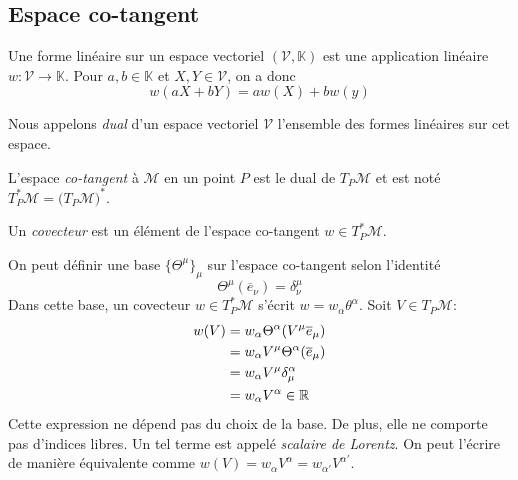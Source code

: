 {\subsection{Espace co-tangent}
\begin{theoremframe}
    \begin{defi}
        Une forme linéaire sur un espace vectoriel $(\mathcal{V},\mathbb{K})$ est une application linéaire $w:\mathcal{V} \to \mathbb{K}$. Pour $a,b\in \mathbb{K}$ et $X,Y \in \mathcal{V}$, on a donc
        \begin{equation}
            w(aX+bY) = aw(X)+bw(y)
        \end{equation}
    \end{defi}
\end{theoremframe}
Nous appelons \textit{dual} d'un espace vectoriel $\mathcal{V}$ l'ensemble des formes linéaires sur cet espace.
\begin{theoremframe}
    \begin{defi}
        L'espace \textit{co-tangent} à $\mathcal{M}$ en un point $P$ est le dual de $T_P\mathcal{M}$ et est noté $T_P^*\mathcal{M} = (T_P\mathcal{M)^*}$.
    \end{defi}
\end{theoremframe}
\begin{theoremframe}
    \begin{defi}
        Un \textit{covecteur} est un élément de l'espace co-tangent $w\in T_P^*\mathcal{M}$.
    \end{defi}
\end{theoremframe}
On peut définir une base $\{\Theta^\mu\}_\mu$ sur l'espace co-tangent selon l'identité
\begin{equation}
    \Theta^\mu(\overline{e}_\nu)=\delta^\mu_\nu
\end{equation}
Dans cette base, un covecteur $w\in T_P^*\mathcal{M}$ s'écrit $w = w_\alpha \theta^\alpha$. Soit $V \in T_P\mathcal{M}$:
\begin{align}
    w(V) &= w_{\alpha} \Theta^{\alpha}(V^{\mu} \overline{e}_\mu)\\
    &=w_{\alpha} V^{\mu}\Theta^{\alpha} (\overline{e}_{\mu})\\
    &= w_{\alpha} V^{\mu}\delta^{\alpha}_{\mu}\\
    &= w_{\alpha} V^{\alpha} \in \mathbb{R}
\end{align}
Cette expression ne dépend pas du choix de la base. De plus, elle ne comporte pas d'indices libres. Un tel terme est appelé \emph{scalaire de Lorentz}. On peut l'écrire de manière équivalente comme $w(V) = w_{\alpha} V^{\alpha} = w_{\alpha '} V^{\alpha '} $.
}
